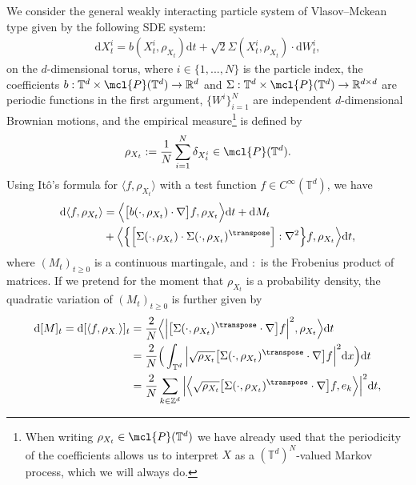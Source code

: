 We consider the general weakly interacting particle system of Vlasov--Mckean type given by the following SDE system:
\begin{align}\label{eq:def-IPS}
\mathrm{d}X^i_t = b(X_t^i, {\rho}_{X_t})\mathrm{d}t +\sqrt{2}\Sigma(X_t^i, {\rho}_{X_t})\cdot \mathrm{d}W^i_t, 
\end{align}
on the $d$-dimensional torus, where $i \in  \{1, ..., N\}$ is the particle index, the coefficients $b: \mathbb{T}^d \times \mcl{P}(\mathbb{T}^d) \to \mathbb{R}^{d}$ and $\Sigma: \mathbb{T}^d \times \mcl{P}(\mathbb{T}^d) \to \mathbb{R}^{d\times d}$ are periodic functions in the first argument, $\{W^i\}_{i=1}^N$ are independent $d$-dimensional Brownian motions,  and the empirical measure\footnote{When writing ${\rho}_{X_t} \in \mcl{P}(\mathbb{T}^d)$ we have already used that the periodicity of the coefficients allows us to interpret $X$ as a $(\mathbb{T}^d)^N$-valued Markov process, which we will always do.}  is defined by
\begin{equation*}
{\rho}_{X_t} := \frac{1}{N} \sum_{i=1}^N \delta_{X_t^i} \in \mcl{P}(\mathbb{T}^d).
\end{equation*}
Using It\^o's formula for $\langle f, {\rho}_{X_t} \rangle$ with a test function $f \in C^{\infty}(\mathbb{T}^d)$, we have
\begin{equation*}
\begin{split}
    \mathrm{d}\langle f, {\rho}_{X_t}\rangle & = \Big\langle \big[b(\cdot, {\rho}_{X_t}) \cdot \nabla\big] f, {\rho}_{X_t} \Big\rangle \mathrm{d}t + \mathrm{d}M_t \\
    & + \Big\langle \Big\{\Big[\Sigma (\cdot, {\rho}_{X_t})  \cdot \Sigma (\cdot, {\rho}_{X_t})^{\transpose}\Big] : \nabla^2 \Big\}f, {\rho}_{X_t} \Big\rangle \mathrm{d}t,
   \end{split}
\end{equation*} 
where $(M_t)_{t \geq 0}$ is a continuous martingale, and $:$ is the Frobenius product of matrices. If we pretend for the moment that $\rho_{X_t}$ is a probability density, the quadratic variation of $(M_t)_{t \geq 0}$ is further given by
\begin{align*}
    \mathrm{d}[M]_t = \mathrm{d}[\langle f, {\rho}_{X_{\cdot}}\rangle]_t 
    & = \frac{2}{N}\Big \langle \Big|\big[\Sigma (\cdot, {\rho}_{X_t})^{\transpose} \cdot \nabla\big]f\Big|^2, {\rho}_{X_t} \Big\rangle \mathrm{d}t\\
    & = \frac{2}{N}\Big(\int_{\mathbb{T}^d}\Big|\sqrt{{\rho}_{X_t}}\big[\Sigma (\cdot, {\rho}_{X_t})^{\transpose} \cdot \nabla\big]f\Big|^2\mathrm{d}x\Big)\mathrm{d}t\\
    & = \frac{2}{N} \sum_{k \in \mathbb{Z}^d}\Big|\Big\langle\sqrt{{\rho}_{X_t}}\big[\Sigma (\cdot, {\rho}_{X_t})^{\transpose} \cdot \nabla\big]f, e_k\Big\rangle\Big|^2\mathrm{d}t,
\end{align*}
